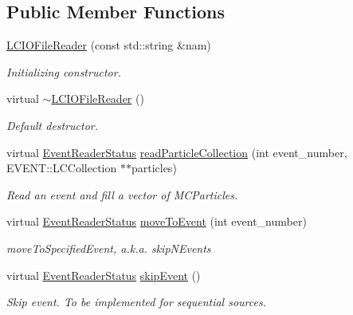 \subsection*{Public Member Functions}
\begin{DoxyCompactItemize}
\item 
\hyperlink{class_d_d4hep_1_1_simulation_1_1_l_c_i_o_file_reader_a98e9bb0a70768e6cd517f7f3ab552dc6}{L\+C\+I\+O\+File\+Reader} (const std\+::string \&nam)
\begin{DoxyCompactList}\small\item\em Initializing constructor. \end{DoxyCompactList}\item 
virtual \hyperlink{class_d_d4hep_1_1_simulation_1_1_l_c_i_o_file_reader_aa8bf3dbda65e5c2443027f2dd94390e4}{$\sim$\+L\+C\+I\+O\+File\+Reader} ()
\begin{DoxyCompactList}\small\item\em Default destructor. \end{DoxyCompactList}\item 
virtual \hyperlink{class_d_d4hep_1_1_simulation_1_1_geant4_event_reader_ae4f4bc83ffcf5b0c1868ad78859851e7}{Event\+Reader\+Status} \hyperlink{class_d_d4hep_1_1_simulation_1_1_l_c_i_o_file_reader_a4163f75ac06423136ab2c3e806713b83}{read\+Particle\+Collection} (int event\+\_\+number, E\+V\+E\+N\+T\+::\+L\+C\+Collection $\ast$$\ast$particles)
\begin{DoxyCompactList}\small\item\em Read an event and fill a vector of M\+C\+Particles. \end{DoxyCompactList}\item 
virtual \hyperlink{class_d_d4hep_1_1_simulation_1_1_geant4_event_reader_ae4f4bc83ffcf5b0c1868ad78859851e7}{Event\+Reader\+Status} \hyperlink{class_d_d4hep_1_1_simulation_1_1_l_c_i_o_file_reader_ad4648d75cd88d24476ff41e493b5c0ed}{move\+To\+Event} (int event\+\_\+number)
\begin{DoxyCompactList}\small\item\em move\+To\+Specified\+Event, a.\+k.\+a. skip\+N\+Events \end{DoxyCompactList}\item 
virtual \hyperlink{class_d_d4hep_1_1_simulation_1_1_geant4_event_reader_ae4f4bc83ffcf5b0c1868ad78859851e7}{Event\+Reader\+Status} \hyperlink{class_d_d4hep_1_1_simulation_1_1_l_c_i_o_file_reader_a4b14dad308419f968982e216c11bb15a}{skip\+Event} ()
\begin{DoxyCompactList}\small\item\em Skip event. To be implemented for sequential sources. \end{DoxyCompactList}\end{DoxyCompactItemize}
